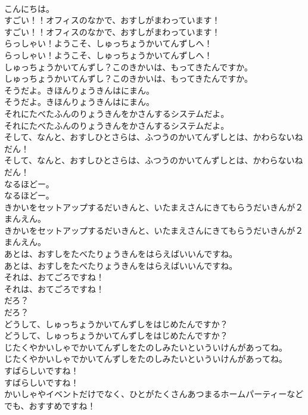 \documentclass[8pt]{extreport}
\begin{document}
\begin{CJK}{UTF8}{min}
\\	こんにちは。
\\	すごい！！オフィスのなかで、おすしがまわっています！
\\	すごい！！オフィスのなかで、おすしがまわっています！
\\	らっしゃい！ようこそ、しゅっちょうかいてんずしへ！
\\	らっしゃい！ようこそ、しゅっちょうかいてんずしへ！
\\	しゅっちょうかいてんずし？このきかいは、もってきたんですか。
\\	しゅっちょうかいてんずし？このきかいは、もってきたんですか。
\\	そうだよ。きほんりょうきんはにまん。
\\	そうだよ。きほんりょうきんはにまん。
\\	それにたべたふんのりょうきんをかさんするシステムだよ。
\\	それにたべたふんのりょうきんをかさんするシステムだよ。
\\	そして、なんと、おすしひとさらは、ふつうのかいてんずしとは、かわらないねだん！
\\	そして、なんと、おすしひとさらは、ふつうのかいてんずしとは、かわらないねだん！
\\	なるほどー。
\\	なるほどー。
\\	きかいをセットアップするだいきんと、いたまえさんにきてもらうだいきんが２まんえん。
\\	きかいをセットアップするだいきんと、いたまえさんにきてもらうだいきんが２まんえん。
\\	あとは、おすしをたべたりょうきんをはらえばいいんですね。
\\	あとは、おすしをたべたりょうきんをはらえばいいんですね。
\\	それは、おてごろですね！
\\	それは、おてごろですね！
\\	だろ？
\\	だろ？
\\	どうして、しゅっちょうかいてんずしをはじめたんですか？
\\	どうして、しゅっちょうかいてんずしをはじめたんですか？
\\	じたくやかいしゃでかいてんずしをたのしみたいといういけんがあってね。
\\	じたくやかいしゃでかいてんずしをたのしみたいといういけんがあってね。
\\	すばらしいですね！
\\	すばらしいですね！
\\	かいしゃやイベントだけでなく、ひとがたくさんあつまるホームパーティーなどでも、おすすめですね！

\end{CJK}
\end{document}
